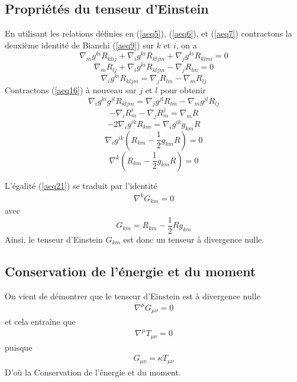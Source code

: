 \documentclass[a4paper,12pt]{report}
\theoremstyle{plain}
\theoremstyle{plain}
\begin{document}
\subsection{Propri\'et\'es du tenseur d'Einstein}
En utilisant les relations d\'efinies en (\ref{aeq5}), (\ref{aeq6}), et (\ref{aeq7}) 
contractons la deuxi\`eme identit\'e de Bianchi (\ref{aeq9}) sur $k$ et $i$,  on a\\
\begin{equation}
 \nabla_{m}g^{ki}R_{klij} +\nabla_{i}g^{ki}R_{kljm} + \nabla_{j}g^{ki}R_{klmi} =0 \label{aeq14}
\end{equation}
\begin{equation}
 \nabla_{m}R_{lj} + \nabla_{i} g^{ki}R_{kljm} - \nabla_{j} R_{lm} =0 \label{aeq15}
\end{equation}
\begin{equation}
 \nabla_{i} g^{ki}R_{kljm} = \nabla_{j} R_{lm} -\nabla_{m}R_{lj} \label{aeq16}
\end{equation}
Contractons (\ref{aeq16}) \`a nouveau sur $j$ et $l$  pour obtenir\\
\begin{equation}
 \nabla_{i} g^{ki}g^{jl}R_{kljm} = \nabla_{j} g^{jl} R_{lm} -\nabla_{m} g^{jl}R_{lj} \label{aeq17}
\end{equation}
\begin{equation}
 -\nabla_{i} R^{i}_{m} - \nabla_{j}  R^{j}_{m} = \nabla_{m} R \label{aeq18}
\end{equation}
\begin{equation}
-2\nabla_{i} g^{ik}R_{km}=\nabla_{i} g^{ik}g_{km} R \label{aeq19}
\end{equation}
 \begin{equation}
 \nabla_{i} g^{ik} (  R_{km} - \frac{1}{2} g_{km} R ) =0 \label{aeq20}
 \end{equation}
\begin{equation}
 \nabla^{k} (  R_{km} - \frac{1}{2} g_{km} R) =0 \label{aeq21}
\end{equation}

L'\'egalit\'e (\ref{aeq21}) se traduit par l'identit\'e
\begin{eqnarray}
 \nabla^{k}G_{km}=0 \label{aeq}
\end{eqnarray}
avec
\begin{equation}
G_{km} =  R_{km} - \frac{1}{2}R g_{km}  \label{aeq22}
\end{equation}
Ainsi, le tenseur d'Einstein $G_{km}$ est donc un tenseur \`a divergence nulle.
\subsection{Conservation de l'\'energie et du moment}
On vient de d\'emontrer que  le tenseur d'Einstein est  \`a divergence nulle
\begin{eqnarray}
 \nabla^{\mu}G_{\mu\nu}=0
\end{eqnarray}
 et cela entra\^ine que
 \begin{eqnarray}
 \nabla^{\mu}T_{\mu\nu}=0
\end{eqnarray}
puisque 
\begin{eqnarray}
 G_{\mu\nu}=\kappa T_{\mu\nu}  
\end{eqnarray}
D'o\`u la Conservation de l'\'energie et du moment.
\end{document}
